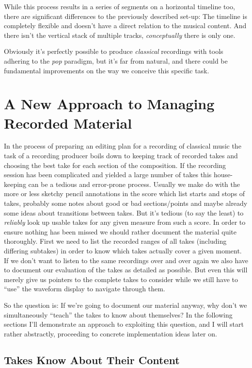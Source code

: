 \documentclass[11pt,a4paper]{article}
\begin{document}
While this process results in a series of segments on a horizontal timeline too, there are significant differences to the previously described set-up:
The timeline is completely flexible and doesn't have a direct relation to the musical content.
And there isn't the vertical stack of multiple tracks, \emph{conceptually} there is only one.

Obviously it's perfectly possible to produce \emph{classical} recordings with tools adhering to the \emph{pop} paradigm, but it's far from natural, and there could be fundamental improvements on the way we conceive this specific task. 

\section{A New Approach to Managing Recorded Material}

In the process of preparing an editing plan for a recording of classical music the task of a recording producer boils down to keeping track of recorded takes and choosing the best take for each section of the composition.
If the recording session has been complicated and yielded a large number of takes this house-keeping can be a tedious and error-prone process.
Usually we make do with the more or less sketchy pencil annotations in the score which list starts and stops of takes, probably some notes about good or bad sections/points and maybe already some ideas about transitions between takes.
But it's tedious (to say the least) to \emph{reliably} look up usable takes for any given measure from such a score.
In order to ensure nothing has been missed we should rather document the material quite thoroughly.
First we need to list the recorded ranges of all takes (including differing subtakes) in order to know which takes actually cover a given moment.
If we don't want to listen to the same recordings over and over again we also have to document our evaluation of the takes as detailed as possible.
But even this will merely give us pointers to the complete takes to consider while we still have to “use” the waveform display to navigate through them.

So the question is: If we're going to document our material anyway, why don't we simultaneously “teach” the takes to know about themselves?
In the following sections I'll demonstrate an approach to exploiting this question, and I will start rather abstractly, proceeding to concrete implementation ideas later on.

\subsection{Takes Know About Their Content}
\end{document}
